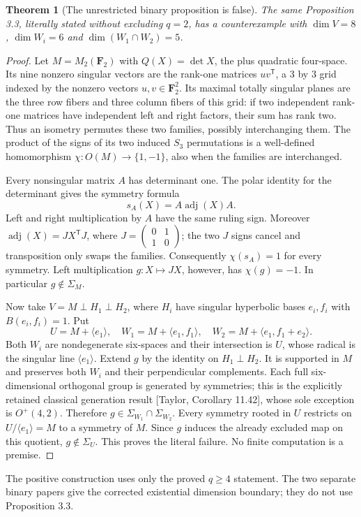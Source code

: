\documentclass[11pt,a4paper]{article}
\newtheorem{theorem}{Theorem}
\newcommand{\gen}[1]{\langle#1\rangle}
\newcommand{\F}{\mathbf F}
\begin{document}
\begin{theorem}[The unrestricted binary proposition is false]
The same Proposition 3.3, literally stated without excluding $q=2$,
has a counterexample with $\dim V=8$, $\dim W_i=6$ and
$\dim(W_1\cap W_2)=5$.
\end{theorem}
\begin{proof}
Let $M=M_2(\F_2)$ with $Q(X)=\det X$, the plus quadratic
four-space. Its nine nonzero singular vectors are the rank-one
matrices $uv^{\mathsf T}$, a $3$ by $3$ grid indexed by the
nonzero vectors $u,v\in\F_2^2$. Its maximal totally singular
planes are the three row fibers and three column fibers of this
grid: if two independent rank-one matrices have independent
left and right factors, their sum has rank two. Thus an isometry
permutes these two families, possibly interchanging them.
The product of the signs of its two induced $S_3$ permutations is
a well-defined homomorphism $\chi:O(M)\to\{1,-1\}$, also
when the families are interchanged.

Every nonsingular matrix $A$ has determinant one. The polar
identity for the determinant gives the symmetry formula
\[
                       s_A(X)=A\operatorname{adj}(X)A.
\]
Left and right multiplication by $A$ have the same ruling sign.
Moreover $\operatorname{adj}(X)=JX^{\mathsf T}J$, where
$J=\left(\begin{smallmatrix}0&1\\1&0\end{smallmatrix}\right)$;
the two $J$ signs cancel and transposition only swaps the families.
Consequently $\chi(s_A)=1$ for every symmetry.
Left multiplication $g:X\mapsto JX$, however, has $\chi(g)=-1$.
In particular $g\notin\Sigma_M$.

Now take $V=M\perp H_1\perp H_2$, where $H_i$ have singular
hyperbolic bases $e_i,f_i$ with $B(e_i,f_i)=1$. Put
\[
 U=M+\gen{e_1},\quad W_1=M+\gen{e_1,f_1},\quad
 W_2=M+\gen{e_1,f_1+e_2}.
\]
Both $W_i$ are nondegenerate six-spaces and their intersection is
$U$, whose radical is the singular line $\gen{e_1}$.
Extend $g$ by the identity on $H_1\perp H_2$. It is supported
in $M$ and preserves both $W_i$ and their perpendicular complements.
Each full six-dimensional orthogonal group is generated by
symmetries; this is the explicitly retained classical generation
result [Taylor, Corollary 11.42], whose sole exception is
$O^+(4,2)$. Therefore $g\in\Sigma_{W_1}\cap\Sigma_{W_2}$.
Every symmetry rooted in $U$ restricts on $U/\gen{e_1}=M$
to a symmetry of $M$. Since $g$ induces the already excluded
map on this quotient, $g\notin\Sigma_U$. This proves the
literal failure. No finite computation is a premise.
\end{proof}
The positive construction uses only the proved $q\geq4$ statement.
The two separate binary papers give the corrected existential
dimension boundary; they do not use Proposition 3.3.
\end{document}
